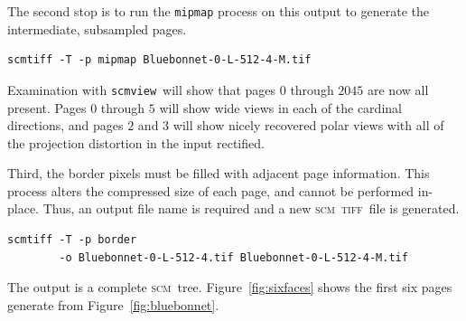 \documentclass[oneside,11pt]{memoir}
\newcommand{\scm}     {\textsc{scm}}
\newcommand{\tiff}    {\textsc{tiff}}
\newcommand{\scmview} {\texttt{scmview}}
\begin{document}
\begin{Spacing}{1.1}
The second stop is to run the \texttt{mipmap} process on this output to generate the intermediate, subsampled pages.

\begin{verbatim}
scmtiff -T -p mipmap Bluebonnet-0-L-512-4-M.tif
\end{verbatim}

Examination with \scmview\ will show that pages $0$ through $2045$ are now all present. Pages $0$ through $5$ will show wide views in each of the cardinal directions, and pages $2$ and $3$ will show nicely recovered polar views with all of the projection distortion in the input rectified.

Third, the border pixels must be filled with adjacent page information. This process alters the compressed size of each page, and cannot be performed in-place. Thus, an output file name is required and a new \scm\ \tiff\ file is generated.

\begin{verbatim}
scmtiff -T -p border
        -o Bluebonnet-0-L-512-4.tif Bluebonnet-0-L-512-4-M.tif
\end{verbatim}

The output is a complete \scm\ tree. Figure~\ref{fig:sixfaces} shows the first six pages generate from Figure~\ref{fig:bluebonnet}.


\end{Spacing}
\end{document}

